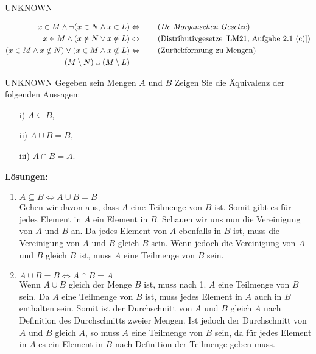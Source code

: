\documentclass{problemset}
\begin{document}
\begin{problem}{UNKNOWN}
\begin{enumerate}
\begin{align*}
              x \in M \land \neg (x \in N \land x \in L)                 & \Leftrightarrow \tag{\textit{De Morganschen Gesetze}}            \\
              x \in M \land (x \notin N \lor x \notin L)                 & \Leftrightarrow \tag{Distributivgesetze [LM21, Aufgabe 2.1 (c)]} \\
              (x \in M \land x \notin N) \lor (x \in M \land x \notin L) & \Leftrightarrow \tag{Zurückformung zu Mengen}                    \\
              (M \setminus N) \cup (M \setminus L)
          \end{align*}
\end{enumerate}
\end{problem}

\begin{problem}{UNKNOWN}
Gegeben sein Mengen $A$ und $B$ Zeigen Sie die Äquivalenz der folgenden Aussagen:
\begin{enumerate}
    \item[i)] $ A \subseteq B $,
    \item[ii)] $ A \cup B = B $,
    \item[iii)] $ A \cap B = A $.
\end{enumerate}
\textbf{Lösungen:}
\begin{enumerate}
    \item $ A \subseteq B \Leftrightarrow A \cup B = B $ \\
          Gehen wir davon aus, dass $A$ eine Teilmenge von $B$ ist.
          Somit gibt es für jedes Element in $A$ ein Element in $B$.
          Schauen wir uns nun die Vereinigung von $A$ und $B$ an.
          Da jedes Element von $A$ ebenfalls in $B$ ist, muss die Vereinigung von $A$ und $B$ gleich $B$ sein.
          Wenn jedoch die Vereinigung von $A$ und $B$ gleich $B$ ist, muss $A$ eine Teilmenge von $B$ sein.
    \item $ A \cup B = B \Leftrightarrow A \cap B = A $ \\
          Wenn $ A \cup B $ gleich der Menge $B$ ist, muss nach 1. $A$ eine Teilmenge von $B$ sein.
          Da $A$ eine Teilmenge von $B$ ist, muss jedes Element in $A$ auch in $B$ enthalten sein.
          Somit ist der Durchschnitt von $A$ und $B$ gleich $A$ nach Definition des Durchschnitts zweier Mengen.
          Ist jedoch der Durchschnitt von $A$ und $B$ gleich $A$, so muss $A$ eine Teilmenge von $B$ sein,
          da für jedes Element in $A$ es ein Element in $B$ nach Definition der Teilmenge geben muss.
\end{enumerate}
\end{problem}
\end{document}
